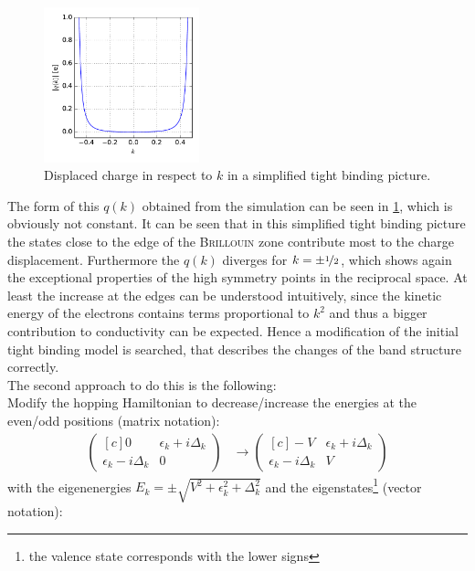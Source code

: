 \begin{figure}
	\centering
	\includegraphics[width = 0.4\textwidth]{Images/Hydrogen/charging/charge_vs_k}
	\caption{Displaced charge in respect to $k$ in a simplified tight binding picture.}
	\label{image_tight_binding_q_vs_k}
\end{figure}
The form of this $q(k)$ obtained from the simulation can be seen in \cref{image_tight_binding_q_vs_k}, which is obviously not constant. It can be seen that in this simplified tight binding picture the states close to the edge of the \textsc{Brillouin} zone contribute most to the charge displacement. Furthermore the $q(k)$ diverges for $k = \pm \nicefrac{1}{2}$, which shows again the exceptional properties of the high symmetry points in the reciprocal space. At least the increase at the edges can be understood intuitively, since the kinetic energy of the electrons contains terms proportional to $k^2$ and thus a bigger contribution to conductivity can be expected. Hence a modification of the initial tight binding model is searched, that describes the changes of the band structure correctly.\\
The second approach to do this is the following:\\
Modify the hopping Hamiltonian to decrease/increase the energies at the even/odd positions (matrix notation):
\begin{align}
\begin{pmatrix*}[c]
0 & \epsilon_k + i \Delta_k \\
\epsilon_k - i \Delta_k & 0
\end{pmatrix*} 
&\to 
\begin{pmatrix*}[c]
-V & \epsilon_k + i \Delta_k \\
\epsilon_k - i \Delta_k & V
\end{pmatrix*}
\end{align}
with the eigenenergies $E_k = \pm \sqrt{V^2+\epsilon_k^2+\Delta_k^2}$ and the eigenstates\footnote{the valence state corresponds with the lower signs} (vector notation):
